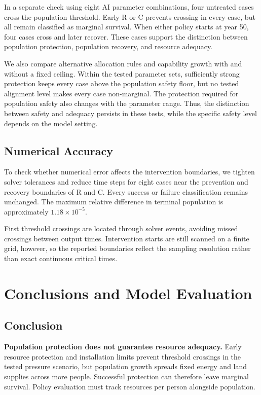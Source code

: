 \documentclass[12pt,a4paper]{article}
\theoremstyle{remark}
\begin{document}
In a separate check using eight AI parameter combinations, four untreated cases cross the population threshold. Early R or C prevents crossing in every case, but all remain classified as marginal survival. When either policy starts at year 50, four cases cross and later recover. These cases support the distinction between population protection, population recovery, and resource adequacy.

We also compare alternative allocation rules and capability growth with and without a fixed ceiling. Within the tested parameter sets, sufficiently strong protection keeps every case above the population safety floor, but no tested alignment level makes every case non-marginal. The protection required for population safety also changes with the parameter range. Thus, the distinction between safety and adequacy persists in these tests, while the specific safety level depends on the model setting.

\subsection{Numerical Accuracy}\label{sec:verification}
To check whether numerical error affects the intervention boundaries, we tighten solver tolerances and reduce time steps for eight cases near the prevention and recovery boundaries of R and C. Every success or failure classification remains unchanged. The maximum relative difference in terminal population is approximately $1.18\times10^{-5}$.

First threshold crossings are located through solver events, avoiding missed crossings between output times. Intervention starts are still scanned on a finite grid, however, so the reported boundaries reflect the sampling resolution rather than exact continuous critical times.


\section{Conclusions and Model Evaluation}

\subsection{Conclusion}

\textbf{Population protection does not guarantee resource adequacy.} Early resource protection and installation limits prevent threshold crossings in the tested pressure scenario, but population growth spreads fixed energy and land supplies across more people. Successful protection can therefore leave marginal survival. Policy evaluation must track resources per person alongside population.
\end{document}
